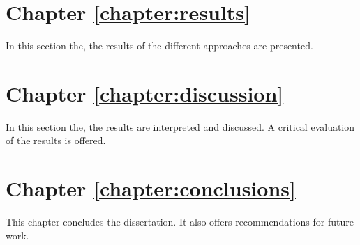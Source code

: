 \section*{Chapter \ref{chapter:results}}

In this section the, the results of the different approaches are presented.

\section*{Chapter \ref{chapter:discussion}}

In this section the, the results are interpreted and discussed.
A critical evaluation of the results is offered.

\section*{Chapter \ref{chapter:conclusions}}

This chapter concludes the dissertation.
It also offers recommendations for future work.